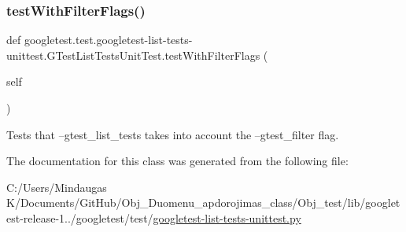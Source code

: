 \subsubsection{\texorpdfstring{testWithFilterFlags()}{testWithFilterFlags()}}
{\footnotesize\ttfamily def googletest.\+test.\+googletest-\/list-\/tests-\/unittest.\+G\+Test\+List\+Tests\+Unit\+Test.\+test\+With\+Filter\+Flags (\begin{DoxyParamCaption}\item[{}]{self }\end{DoxyParamCaption})}

\begin{DoxyVerb}Tests that --gtest_list_tests takes into account the
--gtest_filter flag.\end{DoxyVerb}
 

The documentation for this class was generated from the following file\+:\begin{DoxyCompactItemize}
\item 
C\+:/\+Users/\+Mindaugas K/\+Documents/\+Git\+Hub/\+Obj\+\_\+\+Duomenu\+\_\+apdorojimas\+\_\+class/\+Obj\+\_\+test/lib/googletest-\/release-\/1../googletest/test/\mbox{\hyperlink{_obj__test_2lib_2googletest-release-1_88_81_2googletest_2test_2googletest-list-tests-unittest_8py}{googletest-\/list-\/tests-\/unittest.\+py}}\end{DoxyCompactItemize}

